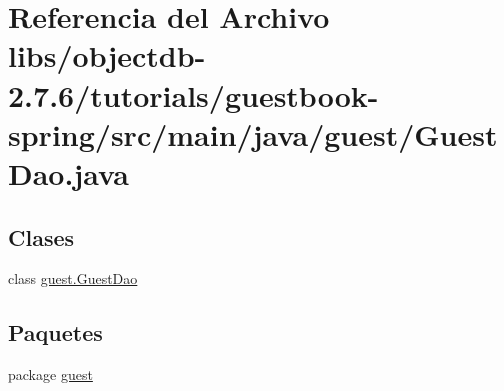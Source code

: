 \hypertarget{guestbook-spring_2src_2main_2java_2guest_2_guest_dao_8java}{}\section{Referencia del Archivo libs/objectdb-\/2.7.6/tutorials/guestbook-\/spring/src/main/java/guest/\+Guest\+Dao.java}
\label{guestbook-spring_2src_2main_2java_2guest_2_guest_dao_8java}
\subsection*{Clases}
\begin{DoxyCompactItemize}
\item 
class \mbox{\hyperlink{classguest_1_1_guest_dao}{guest.\+Guest\+Dao}}
\end{DoxyCompactItemize}
\subsection*{Paquetes}
\begin{DoxyCompactItemize}
\item 
package \mbox{\hyperlink{namespaceguest}{guest}}
\end{DoxyCompactItemize}
